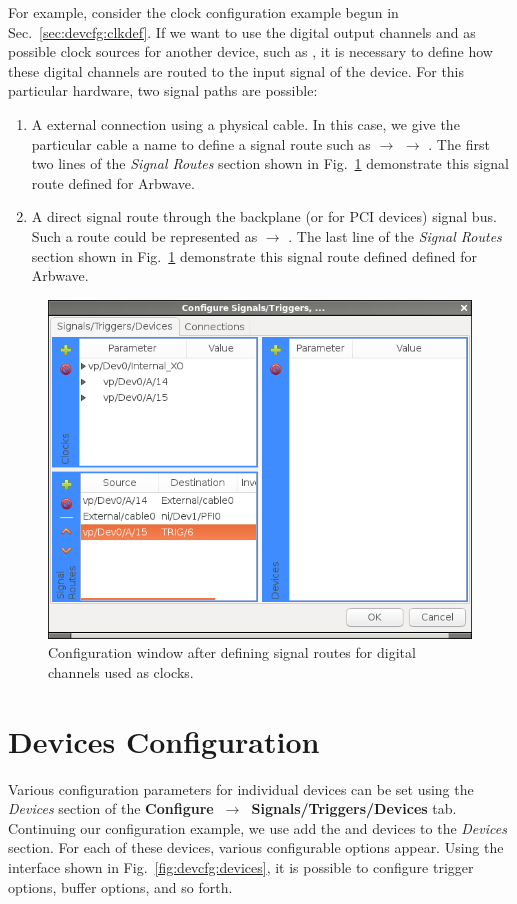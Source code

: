For example, consider the clock configuration example begun in
Sec.~\ref{sec:devcfg:clkdef}.  If we want to use the digital output channels
 and  as possible clock sources for
another device, such as , it is necessary to define how these
digital channels are routed to the  input signal of the
 device.  For this particular hardware, two signal paths are
possible:
\begin{enumerate}
  \item A external connection using a physical cable.  In this case, we give the
    particular cable a name to define a signal route such as
     $\rightarrow$  $\rightarrow$
    .  The first two lines of the \textit{Signal Routes} section
    shown in Fig.~\ref{fig:devcfg:routes-added} demonstrate this signal route
    defined for Arbwave.
  \item A direct signal route through the backplane (or  for PCI
    devices) signal bus.  Such a route could be represented as
     $\rightarrow$ .  The last line of the
    \textit{Signal Routes} section shown in Fig.~\ref{fig:devcfg:routes-added}
    demonstrate this signal route defined defined for Arbwave.
\end{enumerate}


\begin{figure}[ht]
  \centerline{\includegraphics[width=.46\textwidth]{figures/routes-added}}
  \caption[Signal routes configuration]{
    Configuration window after defining signal routes for digital channels used
    as clocks.
  }
  \label{fig:devcfg:routes-added}
\end{figure}


\section{Devices Configuration}\label{sec:devcfg:devices}
Various configuration parameters for individual devices can be set using the
\textit{Devices} section of the
\textbf{Configure~$\rightarrow$~Signals/Triggers/Devices} tab.  Continuing our
configuration example, we use add the  and 
devices to the \textit{Devices} section.  For each of these devices, various
configurable options appear.  Using the interface shown in
Fig.~\ref{fig:devcfg:devices}, it is possible to configure trigger options,
buffer options, and so forth.

